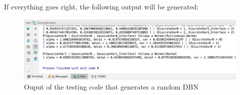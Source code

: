 \documentclass[10pt,a4paper]{article}
\begin{document}
\noindent If everything goes right, the following output will be
generated:\newline


\begin{figure}[h!]
	\includegraphics[width=\linewidth]{img/use_amidst09.png}
	\caption{Ouput of the testing code that generates a random  DBN}
	\label{fig:remoteDeps_output}	
\end{figure}
\end{document}
